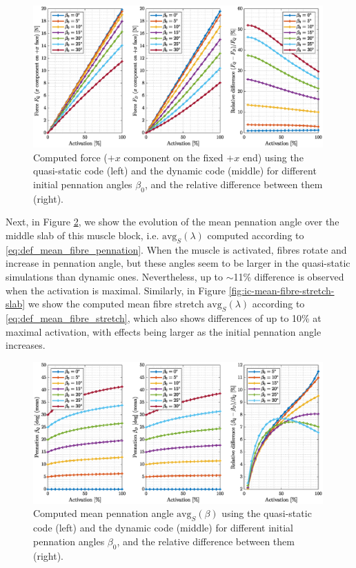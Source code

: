 \documentclass{sfuthesis}
\numberwithin{equation}{section}
\numberwithin{figure}{chapter}
\numberwithin{table}{chapter}
\theoremstyle{definition}
\begin{document}
\begin{figure}
    \centering
    \includegraphics[width=0.99\textwidth]{ic-force-at-end.eps}
    \caption{Computed force ($+x$ component on the fixed $+x$ end) using the quasi-static code (left) and the dynamic code (middle) for different initial pennation angles $\beta_0$, and the relative difference between them (right).
    \label{fig:ic-force-at-end}}
\end{figure}

Next, in Figure \ref{fig:ic-pennation-slab}, we show the evolution of the mean pennation angle over the middle slab of this muscle block, i.e. $\mathrm{avg}_S(\lambda)$ computed according to \eqref{eq:def_mean_fibre_pennation}. When the muscle is activated, fibres rotate and increase in pennation angle, but these angles seem to be larger in the quasi-static simulations than dynamic ones. Nevertheless, up to $\sim$11\% difference is observed when the activation is maximal. Similarly, in Figure \ref{fig:ic-mean-fibre-stretch-slab} we show the computed mean fibre stretch $\mathrm{avg}_S(\lambda)$ according to \eqref{eq:def_mean_fibre_stretch}, which also shows differences of up to 10\% at maximal activation, with effects being larger as the initial pennation angle increases.

\begin{figure}
    \centering
    \includegraphics[width=0.99\textwidth]{ic-pennation-slab.eps}
    \caption{Computed mean pennation angle $\mathrm{avg}_S(\beta)$ using the quasi-static code (left) and the dynamic code (middle) for different initial pennation angles $\beta_0$, and the relative difference between them (right).
    \label{fig:ic-pennation-slab}}
\end{figure}
\end{document}
